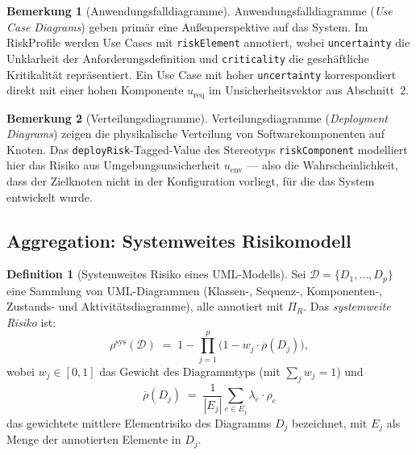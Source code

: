﻿\documentclass[a4paper,12pt]{article}
\theoremstyle{definition}
\newtheorem{definition}{Definition}
\newtheorem{bemerkung}{Bemerkung}
\begin{document}
\begin{bemerkung}[Anwendungsfalldiagramme]
    Anwendungsfalldiagramme (\emph{Use Case Diagrams}) geben prim\"ar eine
    Außenperspektive auf das System. Im \textsf{RiskProfile} werden Use Cases mit
    \texttt{\guillemotleft{}riskElement\guillemotright{}} annotiert, wobei
    \texttt{uncertainty} die Unklarheit der Anforderungsdefinition und
    \texttt{criticality} die gesch\"aftliche Kritikalit\"at repr\"asentiert. Ein
    Use Case mit hoher \texttt{uncertainty} korrespondiert direkt mit einer hohen
    Komponente $u_{\mathrm{req}}$ im Unsicherheitsvektor aus Abschnitt~2.
\end{bemerkung}

\begin{bemerkung}[Verteilungsdiagramme]
    Verteilungsdiagramme (\emph{Deployment Diagrams}) zeigen die physikalische
    Verteilung von Softwarekomponenten auf Knoten. Das \texttt{deployRisk}-Tagged-Value
    des Stereotyps \texttt{\guillemotleft{}riskComponent\guillemotright{}} modelliert
    hier das Risiko aus Umgebungsunsicherheit $u_{\mathrm{env}}$ --- also die
    Wahrscheinlichkeit, dass der Zielknoten nicht in der Konfiguration vorliegt,
    f\"ur die das System entwickelt wurde.
\end{bemerkung}

\subsection{Aggregation: Systemweites Risikomodell}

\begin{definition}[Systemweites Risiko eines UML-Modells]
\label{def:systemrisiko}
    Sei $\mathcal{D} = \{D_1, \ldots, D_p\}$ eine Sammlung von UML-Diagrammen
    (Klassen-, Sequenz-, Komponenten-, Zustands- und Aktivit\"atsdiagramme),
    alle annotiert mit $\Pi_R$. Das \emph{systemweite Risiko} ist:
    \[
        \rho^{\mathrm{sys}}(\mathcal{D}) \;=\; 1 - \prod_{j=1}^{p}
        \bigl(1 - w_j \cdot \overline{\rho}(D_j)\bigr),
    \]
    wobei $w_j \in [0,1]$ das Gewicht des Diagrammtyps (mit $\sum_j w_j = 1$) und
    \[
        \overline{\rho}(D_j) \;=\; \frac{1}{|E_j|}
        \sum_{e \in E_j} \lambda_e \cdot \rho_e
    \]
    das gewichtete mittlere Elementrisiko des Diagramms $D_j$ bezeichnet, mit
    $E_j$ als Menge der annotierten Elemente in $D_j$.
\end{definition}
\end{document}
